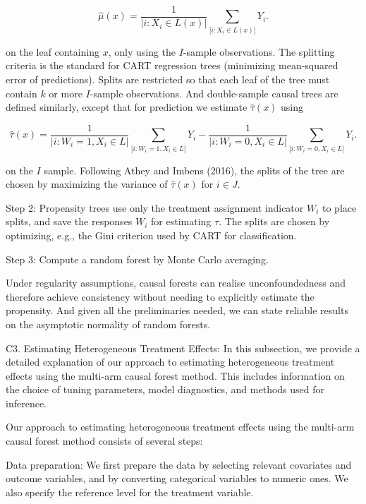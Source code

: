 \documentclass[AER]{AEA}
\begin{document}
\begin{equation}
    \hat{\mu}(x)=\frac{1}{|i:X_{i}\in L(x)|}\sum\limits_{|i:X_{i}\in L(x)|}Y_{i}.
\end{equation}

on the leaf containing \(x\), only using the \(I\)-sample observations.
The splitting criteria is the standard for CART regression trees
(minimizing mean-squared error of predictions). Splits are restricted so
that each leaf of the tree must contain \(k\) or more \(I\)-sample
observations. And double-sample causal trees are defined similarly,
except that for prediction we estimate \(\hat{\tau}(x)\) using

\begin{equation}
    \hat{\tau}(x)=\frac{1}{|i:W_{i}=1,X_{i}\in L|}\sum\limits_{|i:W_{i}=1,X_{i}\in L|}Y_{i}-\frac{1}{|i:W_{i}=0,X_{i}\in L|}\sum\limits_{|i:W_{i}=0,X_{i}\in L|}Y_{i}.
\end{equation}

on the \(I\) sample. Following Athey and Imbens (2016), the splits of
the tree are chosen by maximizing the variance of \(\hat{\tau}(x)\) for
\(i\in J\).

Step 2: Propensity trees use only the treatment assignment indicator
\(W_{i}\) to place splits, and save the responses \(W_{i}\) for
estimating \(\tau\). The splits are chosen by optimizing, e.g., the Gini
criterion used by CART for classification.

Step 3: Compute a random forest by Monte Carlo averaging.

Under regularity assumptions, causal forests can realise
unconfoundedness and therefore achieve consistency without needing to
explicitly estimate the propensity. And given all the preliminaries
needed, we can state reliable results on the asymptotic normality of
random forests.

C3. Estimating Heterogeneous Treatment Effects: In this subsection, we
provide a detailed explanation of our approach to estimating
heterogeneous treatment effects using the multi-arm causal forest
method. This includes information on the choice of tuning parameters,
model diagnostics, and methods used for inference.

Our approach to estimating heterogeneous treatment effects using the
multi-arm causal forest method consists of several steps:

Data preparation: We first prepare the data by selecting relevant
covariates and outcome variables, and by converting categorical
variables to numeric ones. We also specify the reference level for the
treatment variable.
\end{document}
